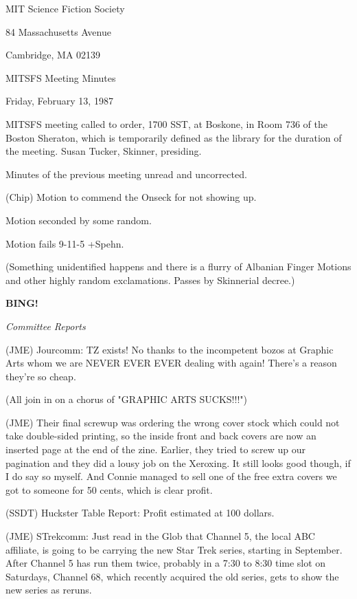 \documentclass[12pt]{article}
\newcommand{\bing}{{\bf BING!} }
\newcommand{\goto}[1]{\bing \vskip 12pt \centerline{{\em{#1}}}}
\begin{document}
\begin{center}

MIT Science Fiction Society 

84 Massachusetts Avenue

Cambridge, MA 02139

\vspace{12pt}

MITSFS Meeting Minutes 

Friday, February 13, 1987

\end{center}
 
\vspace{18pt}

\setlength{\parskip}{6pt}

\noindent
MITSFS meeting called to order, 1700 SST, at Boskone, in Room 736 of the Boston Sheraton, which is temporarily defined as the library for the duration of the meeting.
Susan Tucker, Skinner, presiding.

Minutes of the previous meeting unread and uncorrected.

(Chip) Motion to commend the Onseck for not showing up.

Motion seconded by some random.

Motion fails 9-11-5 +Spehn.

(Something unidentified happens and there is a flurry of Albanian Finger Motions and other highly random exclamations. Passes by Skinnerial decree.)

\goto{Committee Reports}

(JME) Jourcomm: TZ exists! No thanks to the incompetent bozos at Graphic Arts whom we are NEVER EVER EVER dealing with again! There's a reason they're so cheap.

(All join in on a chorus of "GRAPHIC ARTS SUCKS!!!")

(JME) Their final screwup was ordering the wrong cover stock which could not take double-sided printing, so the inside front and back covers are now an inserted page at the end of the zine. Earlier, they tried to screw up our pagination and they did a lousy job on the Xeroxing. It still looks good though, if I do say so myself. And Connie managed to sell one of the free extra covers we got to someone for 50 cents, which is clear profit.

(SSDT) Huckster Table Report: Profit estimated at 100 dollars.

(JME) STrekcomm: Just read in the Glob that Channel 5, the local ABC affiliate, is going to be carrying the new Star Trek series, starting in September. After Channel 5 has run them twice, probably in a 7:30 to 8:30 time slot on Saturdays, Channel 68, which recently acquired the old series, gets to show the new series as reruns.
\end{document}
